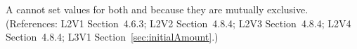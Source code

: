 A \Species cannot set values for both  and
 because they are mutually exclusive.  (References:
L2V1 Section~4.6.3; L2V2 Section~4.8.4; L2V3 Section~4.8.4; L2V4 
Section~4.8.4; L3V1 Section~\ref{sec:initialAmount}.)
